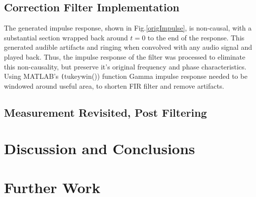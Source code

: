 \documentclass{report}
\begin{document}
        \section{Correction Filter Implementation}
            The generated impulse response, shown in Fig.\ref{origImpulse}, is non-causal, with a substantial section wrapped back around $t=0$ to the end of the response.
            This generated audible artifacts and ringing when convolved with any audio signal and played back.
            Thus, the impulse response of the filter was processed to eliminate this non-causality, but preserve it's original frequency and phase characteristics.
            Using MATLAB's \texttt(tukeywin()) function
            Gamma impulse response needed to be windowed around useful area, to shorten FIR filter and remove artifacts.


    \section{Measurement Revisited, Post Filtering}


\chapter{Discussion and Conclusions}

\chapter{Further Work}



\end{document}
